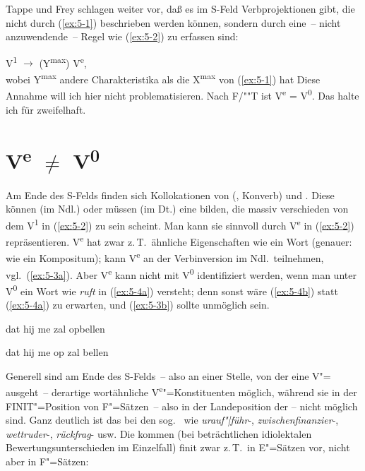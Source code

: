 \documentclass[output=paper]{LSP/langsci}
\begin{document}
Tappe und Frey schlagen weiter vor, daß es im S-Feld Verbprojektionen gibt, die nicht durch (\ref{ex:5-1}) beschrieben werden können, sondern durch eine~-- nicht  anzuwendende~-- Regel wie (\ref{ex:5-2}) zu erfassen sind:

\ea%
\label{ex:5-2}
V\textsuperscript{1} ${\rightarrow}$ (Y\textsuperscript{max})  V\textsuperscript{e}, \\
wobei Y\textsuperscript{max} andere Charakteristika als die X\textsuperscript{max} von (\ref{ex:5-1}) hat
\z
Diese Annahme will ich hier nicht problematisieren. Nach F/""T ist V\textsuperscript{e} = V\textsuperscript{0}. Das halte ich für zweifelhaft.


\section{V\textsuperscript{e} ${\neq}$ V\textsuperscript{0}}%
\label{sec:5-1}

Am Ende des S-Felds finden sich Kollokationen von  (, Konverb) und . Diese können (im Ndl.) oder müssen (im Dt.) eine  bilden, die massiv verschieden von dem V\textsuperscript{1} in (\ref{ex:5-2}) zu sein scheint. Man kann sie sinnvoll durch V\textsuperscript{e} in (\ref{ex:5-2}) repräsentieren. V\textsuperscript{e} hat zwar z.\,T.\ ähnliche Eigenschaften wie ein Wort (genauer: wie ein Kompositum); \zb kann V\textsuperscript{e} an der Verbinversion im Ndl.\ teilnehmen, vgl.\ (\ref{ex:5-3a}). Aber V\textsuperscript{e} kann nicht mit V\textsuperscript{0} identifiziert werden, wenn man unter V\textsuperscript{0} ein Wort wie \zb \textit{ruft} in (\ref{ex:5-4a}) versteht; denn sonst wäre (\ref{ex:5-4b}) statt (\ref{ex:5-4a}) zu erwarten, und (\ref{ex:5-3b}) sollte unmöglich sein.

\begin{exe}
\ex%
\label{ex:5-3}
\begin{xlist}
\ex%
\label{ex:5-3a}
dat hij me zal opbellen

\ex%
\label{ex:5-3b}
dat hij me op zal bellen
\end{xlist}

\ex%
\label{ex:5-4}
\begin{xlist}

\end{xlist}
\end{exe}
Generell sind am Ende des S-Felds~-- also an einer Stelle, von der eine V"= ausgeht~-- derartige wortähnliche V\textsuperscript{e}{}"=Konstituenten möglich, während sie in der FINIT"=Position von F"=Sätzen~-- also in der Landeposition der  – nicht möglich sind. Ganz deutlich ist das bei den sog.\  wie \textit{urauf"|führ}{}-, \textit{zwischenfinanzier}{}-, \textit{wettruder}{}-, \textit{rückfrag}{}- usw. Die kommen (bei beträchtlichen idiolektalen Bewertungsunterschieden im Einzelfall) finit zwar z.\,T.\ in E"=Sätzen vor, nicht aber in F"=Sätzen:
\end{document}
